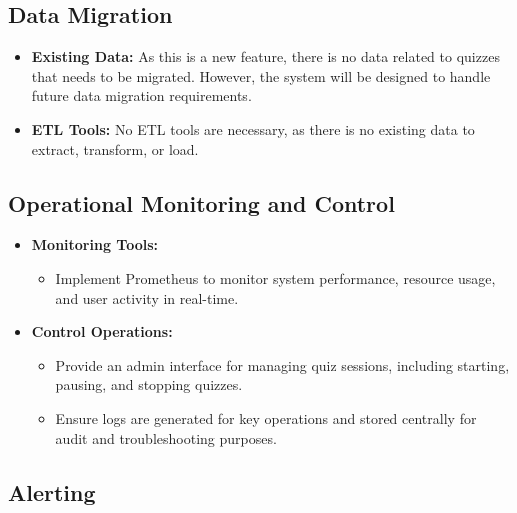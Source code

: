 \subsection{Data Migration}

\begin{itemize}
    \item \textbf{Existing Data:}
          As this is a new feature, there is no data related to quizzes that needs to be migrated. However, the system will be designed to handle future data migration requirements.
    \item \textbf{ETL Tools:}
          No ETL tools are necessary, as there is no existing data to extract, transform, or load.
\end{itemize}


\subsection{Operational Monitoring and Control}

\begin{itemize}
    \item \textbf{Monitoring Tools:}
          \begin{itemize}
              \item Implement Prometheus to monitor system performance, resource usage, and user activity in real-time.
          \end{itemize}
    \item \textbf{Control Operations:}
          \begin{itemize}
              \item Provide an admin interface for managing quiz sessions, including starting, pausing, and stopping quizzes.
              \item Ensure logs are generated for key operations and stored centrally for audit and troubleshooting purposes.
          \end{itemize}
\end{itemize}


\subsection{Alerting}


